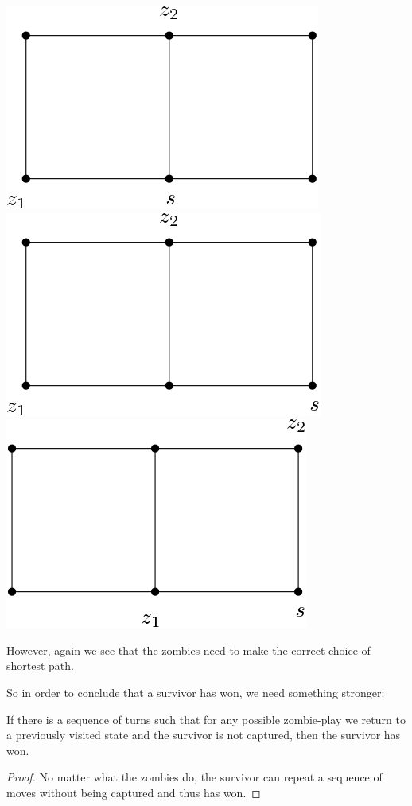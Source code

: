 \documentclass[letterpaper, 10pt]{article}
\begin{document}
\begin{center}
 \includegraphics[scale=0.40]{diagram3}
 \includegraphics[scale=0.40]{diagram4}
 \includegraphics[scale=0.40]{diagram5}
\end{center}

However, again we see that the zombies need to make the correct choice of
shortest path.

So in order to conclude that a survivor has won, we need something stronger:

\begin{lemma}
  If there is a sequence of turns such that for any possible zombie-play
  we return to a previously visited state and the survivor is not captured,
  then the survivor has won.
\end{lemma}
\begin{proof}
  No matter what the zombies do, the survivor can repeat a sequence of moves
  without being captured and thus has won.
\end{proof}
\end{document}
